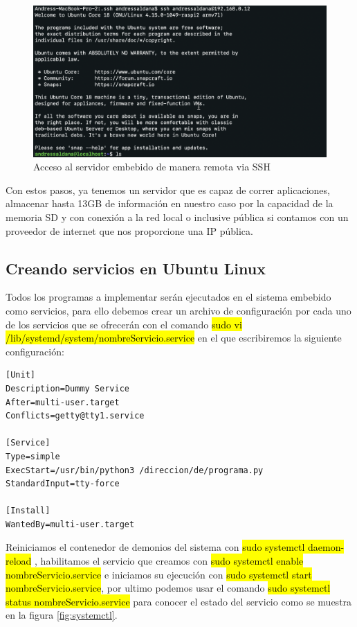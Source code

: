 \begin{figure}[H]
	\centering
	\includegraphics[scale=.3]{Capitulo5/images/login.png}
	\caption{Acceso al servidor embebido de manera remota via SSH}
	\label{fig:login}
\end{figure} 


Con estos pasos, ya tenemos un servidor que es capaz de correr aplicaciones, almacenar hasta 13GB de información en nuestro caso por la capacidad de la memoria SD y con conexión a la red local o inclusive pública si contamos con un proveedor de internet que nos proporcione una IP pública.


\subsection{Creando servicios en Ubuntu Linux}

Todos los programas a implementar serán ejecutados en el sistema embebido como servicios, para ello debemos crear un archivo de configuración por cada uno de los servicios que se ofrecerán con el comando \hl{sudo vi /lib/systemd/system/nombreServicio.service} en el que escribiremos la siguiente configuración:

\begin{lstlisting}
[Unit]
Description=Dummy Service
After=multi-user.target
Conflicts=getty@tty1.service

[Service]
Type=simple
ExecStart=/usr/bin/python3 /direccion/de/programa.py
StandardInput=tty-force

[Install]
WantedBy=multi-user.target
\end{lstlisting}

Reiniciamos el contenedor de demonios del sistema con \hl{sudo systemctl daemon-reload} , habilitamos el servicio que creamos con \hl{sudo systemctl enable nombreServicio.service} e iniciamos su ejecución con \hl{sudo systemctl start nombreServicio.service}, por ultimo podemos usar el comando \hl{sudo systemctl status nombreServicio.service} para conocer el estado del servicio como se muestra en la figura \ref{fig:systemctl}.

